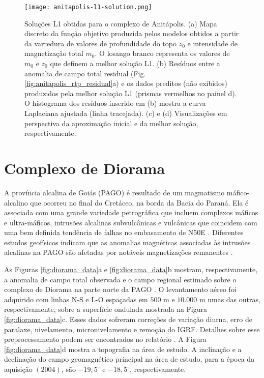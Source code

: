 \begin{figure}[!htb]
	\texttt{[image: anitapolis-l1-solution.png]}
	\caption{Soluções L1 obtidas para o complexo de Anitápolis. 
		(a) Mapa discreto da função objetivo produzida pelos modelos obtidos a partir da varredura de valores de profundidade do topo $z_{0}$ e intensidade de magnetização total $m_{0}$. 
		O losango branco representa os valores de $m_{0}$ e $z_{0}$ que definem a melhor solução L1.
		(b) Resíduos entre a anomalia de campo total residual (Fig. \ref{fig:anitapolis_rtp_residual}a) e os dados preditos (não exibidos) produzidos pela melhor solução L1 (prismas vermelhos no painel d). 
		O histograma dos resíduos inserido em (b) mostra a curva
		Laplaciana ajustada (linha tracejada). 
		(c) e (d) Visualizações em perspectiva da aproximação inicial e da melhor solução, respectivamente.
	}
	\label{fig:anitapolis_l1_result}
\end{figure}
\pagebreak


\section{Complexo de Diorama}
\label{subsec:diorama_complex}


A província alcalina de Goiás (PAGO) é resultado de um magmatismo máfico-alcalino que ocorreu no final do Cretáceo, na borda da Bacia do Paraná.
Ela é associada com uma grande variedade petrográfica que incluem complexos máficos e ultra-máficos, intrusões alcalinas subvulcânicas e vulcânicas que coincidem com uma bem definida tendência de falhas no embasamento de N50E \citep{junqueirabrod_etal2002, junqueira_brod2005}.
Diferentes estudos geofísicos indicam que as anomalias magnéticas associadas às intrusões alcalinas na PAGO são afetadas por notáveis magnetizações remanentes \citep[por exemplo,][]{dutra_etal2012, marangoni_mantovani2013, 
dutra_etal2014, oliveirajr_etal2015, zhang-2018, reis_etal2020}.

As Figuras \ref{fig:diorama_data}a e \ref{fig:diorama_data}b mostram, respectivamente, 
a anomalia de campo total observada e o campo regional estimado sobre o complexo de Diorama na parte norte da PAGO \citep{junqueira_brod2005,
marangoni_mantovani2013, oliveirajr_etal2015}.
O levantamento aéreo foi adquirido com linhas N-S e L-O espaçadas em $500$ m e $10.000$ m umas das outras, respectivamente, sobre a superfície ondulada mostrada na Figura 
\ref{fig:diorama_data}c. 
Esses dados sofreram correções de variação diurna, erro de paralaxe, nivelamento, micronivelamento e remoção do IGRF.
Detalhes sobre esse preprocessamento podem ser encontrados no relatório \cite{goias-2004}.
A Figura \ref{fig:diorama_data}d mostra a topografia na área de estudo.
A inclinação e a declinação do campo geomagnético principal na área de estudo, para a época da aquisição $(2004)$, são $-19,5^{\circ}$ e 
$-18,5^{\circ}$, respectivamente.

